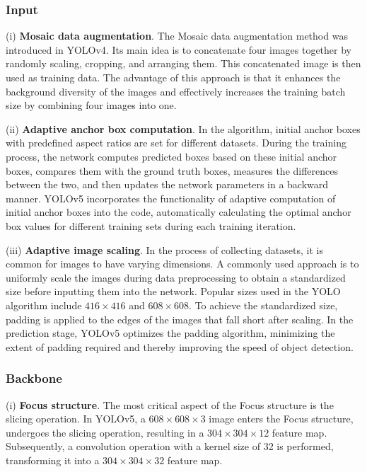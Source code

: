 \subsubsection{Input}

(i) \textbf{Mosaic data augmentation}. The Mosaic data augmentation method was introduced in YOLOv4\cite{bochkovskiy2020yolov4}. Its main idea is to concatenate four images together by randomly scaling, cropping, and arranging them. This concatenated image is then used as training data. The advantage of this approach is that it enhances the background diversity of the images and effectively increases the training batch size by combining four images into one.

(ii) \textbf{Adaptive anchor box computation}. In the algorithm, initial anchor boxes with predefined aspect ratios are set for different datasets. During the training process, the network computes predicted boxes based on these initial anchor boxes, compares them with the ground truth boxes, measures the differences between the two, and then updates the network parameters in a backward manner. YOLOv5 incorporates the functionality of adaptive computation of initial anchor boxes into the code, automatically calculating the optimal anchor box values for different training sets during each training iteration.

(iii) \textbf{Adaptive image scaling}. In the process of collecting datasets, it is common for images to have varying dimensions. A commonly used approach is to uniformly scale the images during data preprocessing to obtain a standardized size before inputting them into the network. Popular sizes used in the YOLO algorithm include $416 \times 416$ and $608 \times 608$. To achieve the standardized size, padding is applied to the edges of the images that fall short after scaling. In the prediction stage, YOLOv5 optimizes the padding algorithm, minimizing the extent of padding required and thereby improving the speed of object detection.

\subsubsection{Backbone}

(i) \textbf{Focus structure}. The most critical aspect of the Focus structure is the slicing operation. In YOLOv5, a $608 \times 608 \times 3$ image enters the Focus structure, undergoes the slicing operation, resulting in a $304 \times 304 \times 12$ feature map. Subsequently, a convolution operation with a kernel size of 32 is performed, transforming it into a $304 \times 304 \times 32$ feature map.

